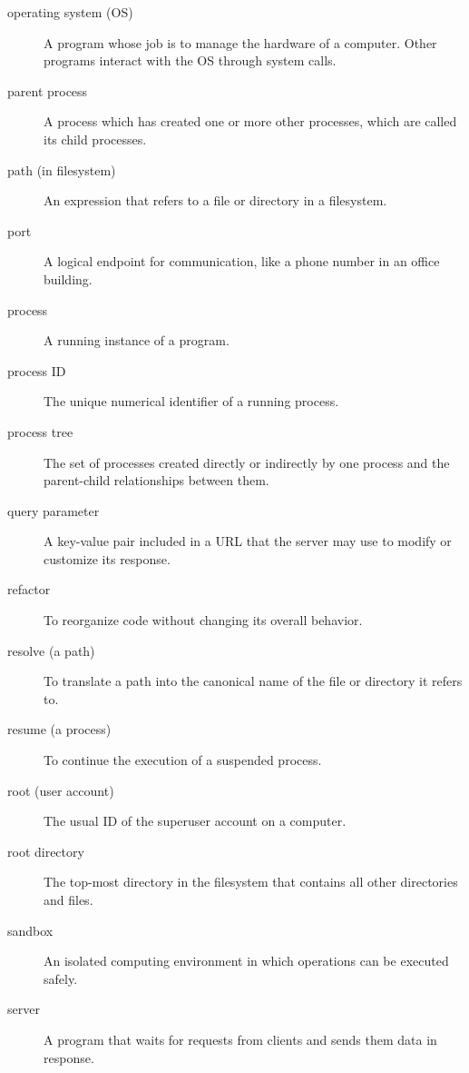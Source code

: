 \documentclass[krantzl]{krantz}
\begin{document}
\begin{description}
\item[operating system (OS)] A program whose job is to manage the hardware of a computer. Other programs interact with the OS through system calls.

\item[parent process] A process which has created one or more other processes, which are called its child processes.

\item[path (in filesystem)] An expression that refers to a file or directory in a filesystem.

\item[port] A logical endpoint for communication, like a phone number in an office building.

\item[process] A running instance of a program.

\item[process ID] The unique numerical identifier of a running process.

\item[process tree] The set of processes created directly or indirectly by one process and the parent-child relationships between them.

\item[query parameter] A key-value pair included in a URL that the server may use to modify or customize its response.

\item[refactor] To reorganize code without changing its overall behavior.

\item[resolve (a path)] To translate a path into the canonical name of the file or directory it refers to.

\item[resume (a process)] To continue the execution of a suspended process.

\item[root (user account)] The usual ID of the superuser account on a computer.

\item[root directory] The top-most directory in the filesystem that contains all other directories and files.

\item[sandbox] An isolated computing environment in which operations can be executed safely.

\item[server] A program that waits for requests from clients and sends them data in response.


\end{description}
\end{document}
